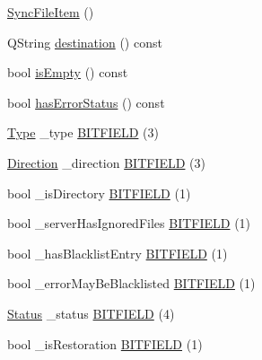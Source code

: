 \begin{DoxyCompactItemize}
\item 
\hyperlink{class_o_c_c_1_1_sync_file_item_ac2d467cf5f79e65f440597884ee4d78f}{Sync\+File\+Item} ()
\item 
Q\+String \hyperlink{class_o_c_c_1_1_sync_file_item_a6760b5f7a7624fa7b75070e3e5eab55d}{destination} () const
\item 
bool \hyperlink{class_o_c_c_1_1_sync_file_item_a50e53014c5068af9e613649cf5e08f5e}{is\+Empty} () const
\item 
bool \hyperlink{class_o_c_c_1_1_sync_file_item_a9605a8ff213a000a039122801575ea33}{has\+Error\+Status} () const
\item 
\hyperlink{class_o_c_c_1_1_sync_file_item_ae6dda85439b3566dc79a922c11dee754}{Type} \+\_\+type \hyperlink{class_o_c_c_1_1_sync_file_item_a300444506fb80b86bfcb075f72905a01}{B\+I\+T\+F\+I\+E\+LD} (3)
\item 
\hyperlink{class_o_c_c_1_1_sync_file_item_ad6db6c9821da051d0c790fb50603922b}{Direction} \+\_\+direction \hyperlink{class_o_c_c_1_1_sync_file_item_a9c687adf113ff7cc15d81b914266cbbd}{B\+I\+T\+F\+I\+E\+LD} (3)
\item 
bool \+\_\+is\+Directory \hyperlink{class_o_c_c_1_1_sync_file_item_abd4cb1d7b3523792bdaa7563b2e88db7}{B\+I\+T\+F\+I\+E\+LD} (1)
\item 
bool \+\_\+server\+Has\+Ignored\+Files \hyperlink{class_o_c_c_1_1_sync_file_item_a1115f09ecc0bba3a76b018fc52a1b6e7}{B\+I\+T\+F\+I\+E\+LD} (1)
\item 
bool \+\_\+has\+Blacklist\+Entry \hyperlink{class_o_c_c_1_1_sync_file_item_a197653561a9ae15f991eedc7296b166f}{B\+I\+T\+F\+I\+E\+LD} (1)
\item 
bool \+\_\+error\+May\+Be\+Blacklisted \hyperlink{class_o_c_c_1_1_sync_file_item_a98651c89e864147d021b2078d8399c53}{B\+I\+T\+F\+I\+E\+LD} (1)
\item 
\hyperlink{class_o_c_c_1_1_sync_file_item_a149ade86eddd9661587bfbc9bcbca408}{Status} \+\_\+status \hyperlink{class_o_c_c_1_1_sync_file_item_a0b2c255ae9d806b6fa36dc5bfddc97c8}{B\+I\+T\+F\+I\+E\+LD} (4)
\item 
bool \+\_\+is\+Restoration \hyperlink{class_o_c_c_1_1_sync_file_item_a9589dd81e18b0f0bacce19674feb308e}{B\+I\+T\+F\+I\+E\+LD} (1)
\end{DoxyCompactItemize}
